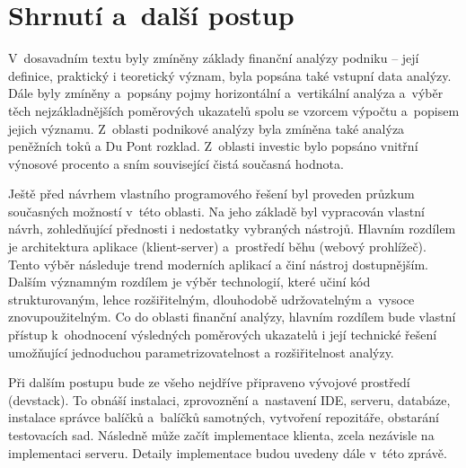 \section{Shrnutí a~další postup}
V~dosavadním textu byly zmíněny základy finanční analýzy podniku -- její definice, praktický i teoretický význam, byla popsána také vstupní data analýzy. Dále byly zmíněny a~popsány pojmy horizontální a~vertikální analýza a~výběr těch nejzákladnějších poměrových ukazatelů spolu se vzorcem výpočtu a~popisem jejich významu. Z~oblasti podnikové analýzy byla zmíněna také analýza peněžních toků a Du Pont rozklad. Z~oblasti investic bylo popsáno vnitřní výnosové procento a sním související čistá současná hodnota.

Ještě před návrhem vlastního programového řešení byl proveden průzkum současných možností v~této oblasti. Na jeho základě byl vypracován vlastní návrh, zohledňující přednosti i nedostatky vybraných nástrojů. Hlavním rozdílem je architektura aplikace (klient-server) a~prostředí běhu (webový prohlížeč). Tento výběr následuje trend moderních aplikací a činí nástroj dostupnějším. Dalším významným rozdílem je výběr technologií, které učiní kód strukturovaným, lehce rozšiřitelným, dlouhodobě udržovatelným a~vysoce znovupoužitelným. Co do oblasti finanční analýzy, hlavním rozdílem bude vlastní přístup k~ohodnocení výsledných poměrových ukazatelů i její technické řešení umožňující jednoduchou parametrizovatelnost a rozšiřitelnost analýzy.

Při dalším postupu bude ze všeho nejdříve připraveno vývojové prostředí (devstack). To obnáší instalaci, zprovoznění a~nastavení IDE, serveru, databáze, instalace správce balíčků a~balíčků samotných, vytvoření repozitáře, obstarání testovacích sad. Následně může začít implementace klienta, zcela nezávisle na implementaci serveru. Detaily implementace budou uvedeny dále v~této zprávě.






















































